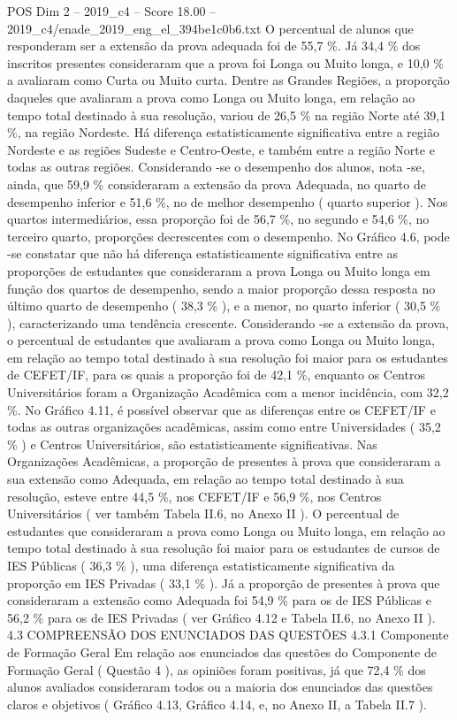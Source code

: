 \begin{textsample}{POS Dim 2 – 2019\_c4 – Score 18.00 – 2019\_c4/enade\_2019\_eng\_el\_394be1c0b6.txt}
O percentual de alunos que responderam ser a extensão da prova adequada foi de 55,7 \%.
Já 34,4 \% dos inscritos presentes consideraram que a prova foi Longa ou Muito longa, e 10,0 \% a avaliaram como Curta ou Muito curta.
Dentre as Grandes Regiões, a proporção daqueles que avaliaram a prova como Longa ou Muito longa, em relação ao tempo total destinado à sua resolução, variou de 26,5 \% na região Norte até 39,1 \%, na região Nordeste.
Há diferença estatisticamente significativa entre a região Nordeste e as regiões Sudeste e Centro-Oeste, e também entre a região Norte e todas as outras regiões.
Considerando -se o desempenho dos alunos, nota -se, ainda, que 59,9 \% consideraram a extensão da prova Adequada, no quarto de desempenho inferior e 51,6 \%, no de melhor desempenho ( quarto superior ).
Nos quartos intermediários, essa proporção foi de 56,7 \%, no segundo e 54,6 \%, no terceiro quarto, proporções decrescentes com o desempenho.
No Gráfico 4.6, pode -se constatar que não há diferença estatisticamente significativa entre as proporções de estudantes que consideraram a prova Longa ou Muito longa em função dos quartos de desempenho, sendo a maior proporção dessa resposta no último quarto de desempenho ( 38,3 \% ), e a menor, no quarto inferior ( 30,5 \% ), caracterizando uma tendência crescente.
Considerando -se a extensão da prova, o percentual de estudantes que avaliaram a prova como Longa ou Muito longa, em relação ao tempo total destinado à sua resolução foi maior para os estudantes de CEFET/IF, para os quais a proporção foi de 42,1 \%, enquanto os Centros Universitários foram a Organização Acadêmica com a menor incidência, com 32,2 \%.
No Gráfico 4.11, é possível observar que as diferenças entre os CEFET/IF e todas as outras organizações acadêmicas, assim como entre Universidades ( 35,2 \% ) e Centros Universitários, são estatisticamente significativas.
Nas Organizações Acadêmicas, a proporção de presentes à prova que consideraram a sua extensão como Adequada, em relação ao tempo total destinado à sua resolução, esteve entre 44,5 \%, nos CEFET/IF e 56,9 \%, nos Centros Universitários ( ver também Tabela II.6, no Anexo II ).
O percentual de estudantes que consideraram a prova como Longa ou Muito longa, em relação ao tempo total destinado à sua resolução foi maior para os estudantes de cursos de IES Públicas ( 36,3 \% ), uma diferença estatisticamente significativa da proporção em IES Privadas ( 33,1 \% ).
Já a proporção de presentes à prova que consideraram a extensão como Adequada foi 54,9 \% para os de IES Públicas e 56,2 \% para os de IES Privadas ( ver Gráfico 4.12 e Tabela II.6, no Anexo II ). 4.3 COMPREENSÃO DOS ENUNCIADOS DAS QUESTÕES 4.3.1 Componente de Formação Geral Em relação aos enunciados das questões do Componente de Formação Geral ( Questão 4 ), as opiniões foram positivas, já que 72,4 \% dos alunos avaliados consideraram todos ou a maioria dos enunciados das questões claros e objetivos ( Gráfico 4.13, Gráfico 4.14, e, no Anexo II, a Tabela II.7 ).

\end{textsample}
